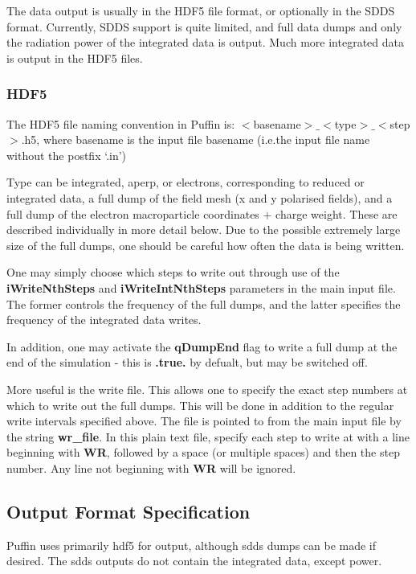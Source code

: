 \documentclass[12pt]{article}%
\begin{document}
The data output is usually in the HDF5 file format, or optionally in the SDDS format. Currently, SDDS support is quite limited, and full data dumps and only the radiation power of the integrated data is output. Much more integrated data is output in the HDF5 files.

\subsubsection{HDF5}

The HDF5 file naming convention in Puffin is: $<$basename$>\_<$type$>\_<$step$>$.h5, where basename is the input file basename (i.e.the input file name without the postfix `.in')

Type can be integrated, aperp, or electrons, corresponding to reduced or integrated data, a full dump of the field mesh (x and y polarised fields), and a full dump of the electron macroparticle coordinates $+$ charge weight. These are described individually in more detail below. Due to the possible extremely large size of the full dumps, one should be careful how often the data is being written.

One may simply choose which steps to write out through use of the {\bf iWriteNthSteps} and {\bf iWriteIntNthSteps} parameters in the main input file. The former controls the frequency of the full dumps, and the latter specifies the frequency of the integrated data writes.

In addition, one may activate the {\bf qDumpEnd} flag to write a full dump at the end of the simulation - this is {\bf .true.} by defualt, but may be switched off. 

More useful is the write file. This allows one to specify the exact step numbers at which to write out the full dumps. This will be done in addition to the regular write intervals specified above. The file is pointed to from the main input file by the string {\bf wr\_file}. In this plain text file, specify each step to write at with a line beginning with {\bf WR}, followed by a space (or multiple spaces) and then the step number. Any line not beginning with {\bf WR} will be ignored.

\subsection{Output Format Specification}

Puffin uses primarily hdf5 for output, although sdds dumps can be made if desired. The sdds outputs do not contain the integrated data, except power.
\end{document}
